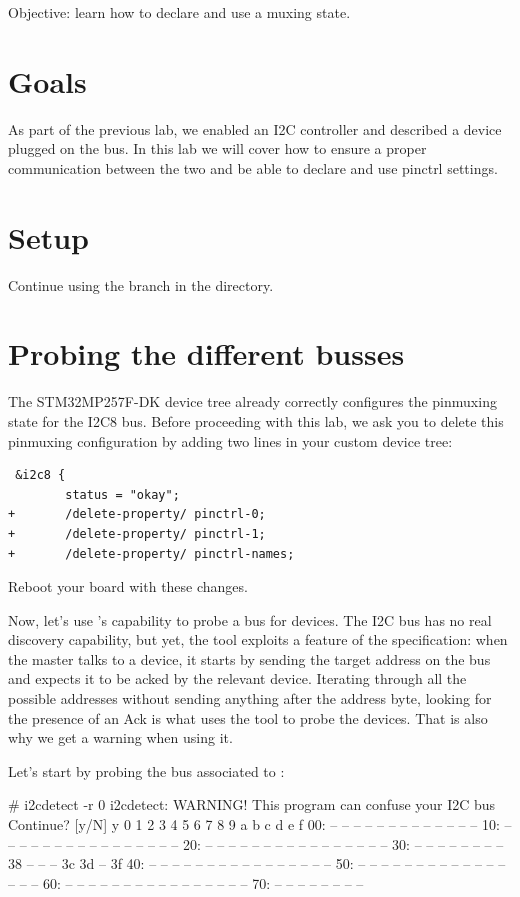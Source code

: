 {Objective: learn how to declare and use a muxing state.}

\section{Goals}

As part of the previous lab, we enabled an I2C controller and described
a device plugged on the bus. In this lab we will cover how to ensure a
proper communication between the two and be able to declare and use
pinctrl settings.

\section{Setup}

Continue using the  branch in the
 directory.

\section{Probing the different busses}

The STM32MP257F-DK device tree already correctly configures the pinmuxing state
for the I2C8 bus. Before proceeding with this lab, we ask you to delete this
pinmuxing configuration by adding two lines in your custom device tree:

\begin{verbatim}
 &i2c8 {
        status = "okay";
+       /delete-property/ pinctrl-0;
+       /delete-property/ pinctrl-1;
+       /delete-property/ pinctrl-names;
\end{verbatim}

Reboot your board with these changes.

Now, let's use 's capability to probe a bus for
devices. The I2C bus has no real discovery capability, but yet, the tool
exploits a feature of the specification: when the master talks to a
device, it starts by sending the target address on the bus and expects
it to be acked by the relevant device. Iterating through all the
possible addresses without sending anything after the address byte,
looking for the presence of an Ack is what uses the tool to probe the
devices. That is also why we get a warning when using it.

Let's start by probing the bus associated to :

\begin{bashinput}
# i2cdetect -r 0
i2cdetect: WARNING! This program can confuse your I2C bus
Continue? [y/N] y
0  1  2  3  4  5  6  7  8  9  a  b  c  d  e  f
00:          -- -- -- -- -- -- -- -- -- -- -- -- -- 
10: -- -- -- -- -- -- -- -- -- -- -- -- -- -- -- -- 
20: -- -- -- -- -- -- -- -- -- -- -- -- -- -- -- -- 
30: -- -- -- -- -- -- -- -- 38 -- -- -- 3c 3d -- 3f 
40: -- -- -- -- -- -- -- -- -- -- -- -- -- -- -- -- 
50: -- -- -- -- -- -- -- -- -- -- -- -- -- -- -- -- 
60: -- -- -- -- -- -- -- -- -- -- -- -- -- -- -- -- 
70: -- -- -- -- -- -- -- --                         
\end{bashinput}

